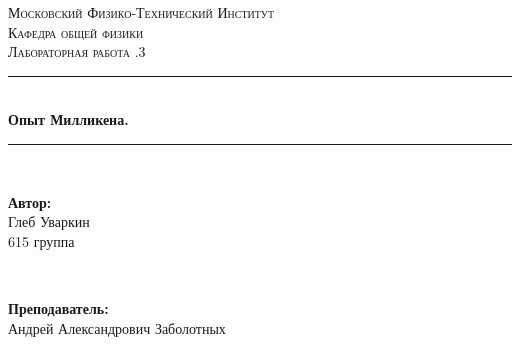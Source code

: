 \documentclass[a4paper, 12pt, twoside]{article}
\begin{document}
\begin{titlepage}

\newcommand{\HRule}{\rule{\linewidth}{0.7mm}} %

\center %
 

\textsc{\LARGE Московский Физико-Технический Институт}\\[1,5cm] %
\textsc{\Large Кафедра общей физики}\\[0.5cm] %
\textsc{\large Лабораторная работа .3}\\[0.5cm] %


\HRule
\\[0.4cm]
{ \huge \bfseries Опыт Милликена.}
\\[0.2cm] %
\HRule
\\[1.5cm]


 

\begin{minipage}{0.4\textwidth}
	\begin{flushleft} \large
		\textbf{Автор:}\\
		Глеб Уваркин \\
		615 группа
	\end{flushleft}
\end{minipage}
~
\begin{minipage}{0.4\textwidth}
	\begin{flushright} \large
		\textbf {Преподаватель:} \\
		Андрей Александрович Заболотных %
	\end{flushright}
\end{minipage}


\end{titlepage}
\end{document}
